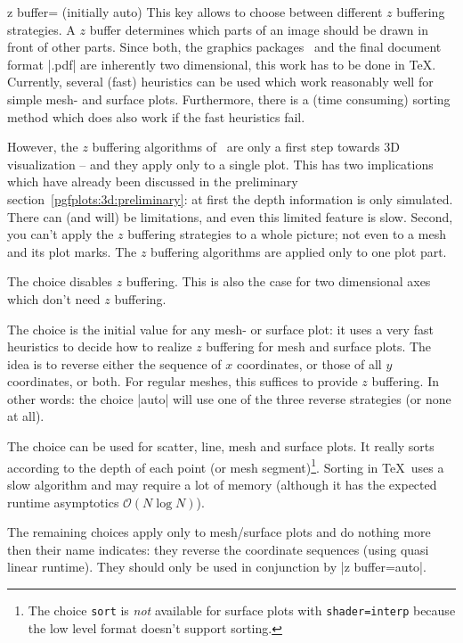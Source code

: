 \begin{pgfplotskey}{z buffer= (initially auto)}
	This key allows to choose between different $z$ buffering strategies. A $z$ buffer determines which parts of an image should be drawn in front of other parts. Since both, the graphics packages \PGF\ and the final document format |.pdf| are inherently two dimensional, this work has to be done in \TeX. Currently, several (fast) heuristics can be used which work reasonably well for simple mesh- and surface plots. Furthermore, there is a (time consuming) sorting method which does also work if the fast heuristics fail.

	However, the $z$ buffering algorithms of \PGFPlots\ are only a first step towards 3D visualization -- and they apply only to a single plot. This has two implications which have already been discussed in the preliminary section~\ref{pgfplots:3d:preliminary}: at first the depth information is only simulated. There can (and will) be limitations, and even this limited feature is slow. Second, you can't apply the $z$ buffering strategies to a whole picture; not even to a mesh and its plot marks. The $z$ buffering algorithms are applied only to one plot part.

	The choice  disables $z$ buffering. This is also the case for two dimensional axes which don't need $z$ buffering.

	The choice  is the initial value for any mesh- or surface plot: it uses a very fast heuristics to decide how to realize $z$ buffering for mesh and surface plots. The idea is to reverse either the sequence of $x$ coordinates, or those of all $y$ coordinates, or both. For regular meshes, this suffices to provide $z$ buffering. In other words: the choice |auto| will use one of the three reverse strategies (or none at all).

	The choice  can be used for scatter, line, mesh and surface plots. It really sorts according to the depth of each point (or mesh segment)\footnote{The choice \texttt{sort} is \emph{not} available for surface plots with \texttt{shader=interp} because the low level format doesn't support sorting.}. Sorting in \TeX\ uses a slow algorithm and may require a lot of memory (although it has the expected runtime asymptotics $\mathcal O(N \log N)$).

	The remaining choices apply only to mesh/surface plots and do nothing more then their name indicates: they reverse the coordinate sequences (using quasi linear runtime). They should only be used in conjunction by |z buffer=auto|.
\end{pgfplotskey}

